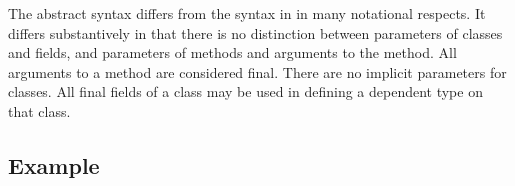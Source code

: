 \documentclass[nocopyrightspace,preprint,10pt]{sigplanconf}
\begin{document}

The abstract syntax differs from the syntax in \cite{DependentTypes}
in many notational respects. It differs substantively in that there is
no distinction between parameters of classes and fields, and
parameters of methods and arguments to the method. All arguments to a
method are considered final. There are no implicit parameters for
classes.  All final fields of a class may be used in defining a
dependent type on that class.

\subsection{Example}
\end{document}
